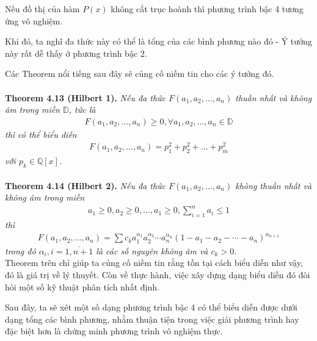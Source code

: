 \documentclass[a4paper,oneside]{book}
\numberwithin{equation}{chapter}
\begin{document}
Nếu đồ thị của hàm $P(x)$ không cắt trục hoành thì phương trình bậc 4 tương ứng vô nghiệm.

Khi đó, ta nghĩ đa thức này có thể là tổng của các bình phương nào đó - Ý tưởng này rất dễ thấy ở phương trình bậc 2.

Các Theorem nổi tiếng sau đây sẽ củng cố niềm tin cho các ý tưởng đó.\\
\\
\textbf{Theorem 4.13 (Hilbert 1).} \textit{Nếu đa thức $F\left( {{a_1},{a_2},\ldots,{a_n}} \right)$ thuần nhất và không âm trong miền $\mathbb{D}$, tức là 
\begin{align}
F\left( {{a_1},{a_2},\ldots,{a_n}} \right) \ge 0,\forall {a_1},{a_2},\ldots,{a_n} \in \mathbb{D}
\end{align}
thì có thể biểu diễn
\begin{align}
F\left( {{a_1},{a_2},\ldots,{a_n}} \right) = p_1^2 + p_2^2 + \ldots + p_m^2
\end{align}
với ${p_k} \in \mathbb{Q} \left[ x \right]$.}\\
\\
\textbf{Theorem 4.14 (Hilbert 2).} \textit{Nếu đa thức $F\left( {{a_1},{a_2},\ldots,{a_n}} \right)$ không thuần nhất và không âm trong miền 
\begin{align}
{a_1} \ge 0,{a_2} \ge 0,\ldots,{a_1} \ge 0,\sum\limits_{i = 1}^n {{a_i}}  \le 1
\end{align}
thì
\begin{align}
F\left( {{a_1},{a_2},\ldots,{a_n}} \right) = \sum {{c_k}a_1^{{\alpha _1}}a_2^{{\alpha _2}}\cdots a_n^{{\alpha _n}}} {\left( {1 - {a_1} - {a_2} - \cdots - {a_n}} \right)^{{\alpha _{n + 1}}}}
\end{align}
trong đó ${\alpha _i},i = \overline {1,n + 1} $ là các số nguyên không âm và ${c_k} > 0$.}\\

Theorem trên chỉ giúp ta củng cố niềm tin rằng tồn tại cách biểu diễn như vậy, đó là giá trị về lý thuyết. Còn về thực hành, việc xây dựng dạng biểu diễn đó đòi hỏi một số kỹ thuật phân tích nhất định.

Sau đây, ta sẽ xét một số dạng phương trình bậc 4 có thể biểu diễn được dưới dạng tổng các bình phương, nhằm thuận tiện trong việc giải phương trình hay đặc biệt hơn là chứng minh phương trình vô nghiệm thực.
\end{document}
